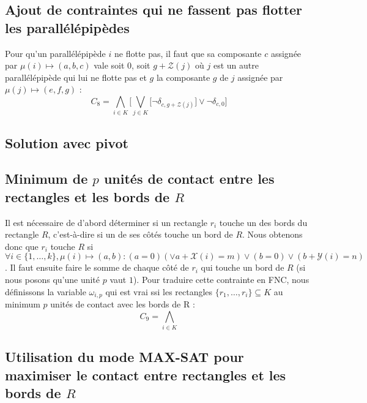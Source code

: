 \documentclass[a4paper]{article}
\begin{document}
\subsection{Ajout de contraintes qui ne fassent pas flotter les parallélépipèdes}
Pour qu'un parallélépipède $i$ ne flotte pas, il faut que sa composante $c$ assignée par $\mu(i) \mapsto (a,b,c)$ vale soit $0$, soit $g + \mathcal{Z}(j)$ où $j$ est un autre parallélépipède qui lui ne flotte pas et $g$ la composante $g$ de $j$ assignée par $\mu(j) \mapsto (e,f,g)$ :
\begin{equation*}
	C_8 =  \bigwedge\limits_{i\in K} \bigg[ \bigvee\limits_{j\in K}\Big[ \lnot \delta_{c, g + \mathcal{Z}(j)} \Big] \lor \lnot \delta_{c, 0} \bigg]
\end{equation*}
\subsection{Solution avec pivot}
\subsection{Minimum de $p$ unités de contact entre les rectangles et les bords de $R$}
Il est nécessaire de d'abord déterminer si un rectangle $r_i$ touche un des bords du rectangle $R$, c'est-à-dire si un de ses côtés touche un bord de $R$. Nous obtenons donc que $r_i$ touche $R$ si  $\forall i \in \{1,\dots, k\}, \mu(i) \mapsto (a,b) :  (a = 0) (\lor a+ \mathcal{X}(i) = m) \lor (b = 0) \lor (b + \mathcal{Y}(i) = n)$. Il faut ensuite faire le somme de chaque côté de $r_i$ qui touche un bord de $R$ (si nous posons qu'une unité $p$ vaut $1$). Pour traduire cette contrainte en FNC, nous définissons la variable $\omega_{i,p}$ qui est vrai ssi les rectangles $\{r_1,\dots ,r_i\} \subseteq K$ au minimum $p$ unités de contact avec les bords de R : 
\begin{equation*}
C_9 =  \bigwedge\limits_{i\in K} 
\end{equation*}

\subsection{Utilisation du mode \textsc{MAX-SAT} pour maximiser le contact entre rectangles et les bords de $R$}
\end{document}
